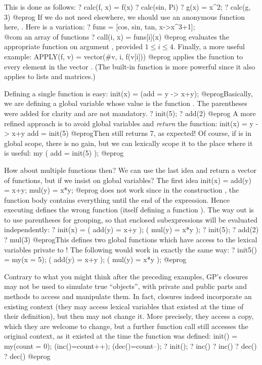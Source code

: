 This is done as follows:
\bprog
? calc(f, x) = f(x)
? calc(sin, Pi)
? g(x) = x^2;
? calc(g, 3)
@eprog
\noindent If we do not need  elsewhere, we should use an anonymous
function here, . Here is a variation:
\bprog
? funs = [cos, sin, tan, x->x^3+1]; \\@com an array of functions
? call(i, x) = funs[i](x)
@eprog\noindent
evaluates the appropriate function on argument ,
provided $1\leq i\leq 4$. Finally, a more useful example:
\bprog
APPLY(f, v) = vector(#v, i, f(v[i]))
@eprog\noindent
applies the function  to every element in the vector .
(The built-in function  is more powerful since it also applies to
lists and matrices.)

Defining a single function is easy:
\bprog
init(x) = (add = y -> x+y);
@eprog\noindent Basically, we are defining a global variable 
whose value is the function . The parentheses were added for
clarity and are not mandatory.
\bprog
? init(5);
? add(2)
@eprog\noindent
A more refined approach is to
avoid global variables and \emph{return} the function:
\bprog
init(x) = y -> x+y
add = init(5)
@eprog\noindent Then  still returns 7, as expected! Of course,
if  is in global scope, there is no gain, but we can
lexically scope it to the place where it is useful:
\bprog
  my ( add = init(5) );
@eprog

How about multiple functions then? We can use the last idea and return a
vector of functions, but if we insist on global variables?
The first idea
\bprog
init(x) = add(y) = x+y; mul(y) = x*y;
@eprog
\noindent does not work since in the construction , the
function body contains everything until the end of the expression. Hence
executing  defines the wrong function  (itself defining
a function ). The way out is to
use parentheses for grouping, so that enclosed subexpressions will be
evaluated independently:
\bprog
? init(x) = ( add(y) = x+y ); ( mul(y) = x*y );
? init(5);
? add(2)
? mul(3)
@eprog\noindent This defines two global functions which have access to the
lexical variables private to ! The following would work in exactly
the same way:
\bprog
? init5() = my(x = 5); ( add(y) = x+y ); ( mul(y) = x*y );
@eprog

 Contrary to what you might think after the
preceding examples, GP's closures may not be used to simulate true
``objects'', with private and public parts and methods to access and
manipulate them. In fact, closures indeed incorporate an existing context
(they may access lexical variables that existed at the time of their
definition), but then may not change it. More precisely, they access a copy,
which they are welcome to change, but a further function call still accesses
the original context, as it existed at the time the function was defined:
\bprog
init() =
{ my(count = 0);
  (inc()=count++);
  (dec()=count--);
}
? init();
? inc()
? inc()
? dec()
? dec()
@eprog


